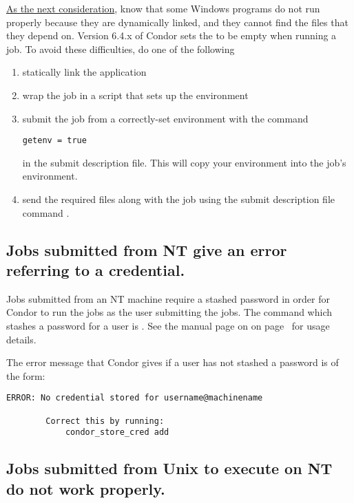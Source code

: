 \underline{As the next consideration},
know that 
some Windows programs do not run properly because they are dynamically linked,
and they cannot find the  files that they depend on.
Version 6.4.x of Condor sets the  to be empty when
running a job.
To avoid these difficulties, do one of the following
\begin{enumerate}
\item statically link the application
\item wrap the job in a script that sets up the environment
\item submit the job from a correctly-set environment with the command
\begin{verbatim}
getenv = true
\end{verbatim}
in the submit description file.
This will copy your environment into the job's environment.
\item send the required  files along with the job
using the submit description file command .
\end{enumerate}


\subsection*{Jobs submitted from NT give an error referring to a credential.}

Jobs submitted from an NT machine require a stashed password in order
for Condor to run the jobs as the user submitting the jobs.
The command which stashes a password for a user is .
See the manual page on
on page~\pageref{man-condor-store-cred}
for usage details.

The error message that Condor gives if a user has not stashed a
password is of the form:
\begin{verbatim}
ERROR: No credential stored for username@machinename

        Correct this by running:
	        condor_store_cred add
\end{verbatim}

\subsection*{Jobs submitted from Unix to execute on NT do not work properly.}


